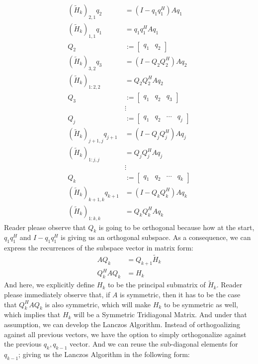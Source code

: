 \documentclass[]{article}
\theoremstyle{definition}
\begin{document}
        \begin{align}
            (\tilde{H}_k)_{2, 1}q_2 &= (I - q_1q_1^H)Aq_1
            \\
            (\tilde{H}_k)_{1, 1}q_1 &= q_1q_1^HAq_1
            \\
            Q_2 &:= \begin{bmatrix}
                q_1 & q_2
            \end{bmatrix}
            \\
            (\tilde{H}_k)_{3, 2}q_3 &= (I - Q_2Q_2^H)Aq_2
            \\
            (\tilde{H}_k)_{1:2, 2} &= Q_2Q_2^HAq_2
            \\
            Q_3 &:= \begin{bmatrix}
                q_1 & q_2 & q_3
            \end{bmatrix}
            \\
            & \vdots 
            \\
            Q_j &:= \begin{bmatrix}
                q_1 & q_2 & \cdots & q_j
            \end{bmatrix}
            \\
            (\tilde{H}_k)_{j + 1, j}q_{j + 1}&= (I - Q_jQ_j^H)Aq_j
            \\
            (\tilde{H}_k)_{1:j, j} &= Q_jQ_j^HAq_j
            \\
            &\vdots 
            \\
            Q_k &:= \begin{bmatrix}
                q_1 & q_2 & \cdots & q_k
            \end{bmatrix}
            \\
            (\tilde{H}_k)_{k + 1, k}q_{k + 1}&= (I - Q_kQ_k^H)Aq_k
            \\
            (\tilde{H}_k)_{1:k, k} &= Q_kQ_k^HAq_k
        \end{align}
        Reader please observe that $Q_k$ is going to be orthogonal because how at the start, $q_1q_1^H$ and $I - q_1q_1^H$ is giving us an orthogonal subspace. As a consequence, we can express the recurrences of the subspace vector in matrix form: 
        \begin{align}
            AQ_{k} &= Q_{k + 1}\tilde{H}_k
            \\
            Q_{k}^HAQ_{k} &= H_k
        \end{align}
        And here, we explicitly define $H_k$ to be the principal submatrix of $\tilde{H}_k$. Reader please immediately observe that, if $A$ is symmetric, then it has to be the case that $Q^H_kAQ_k$ is also symmetric, which will make $H_k$ to be symmetric as well, which implies that $H_k$ will be a Symmetric Tridiagonal Matrix. And under that assumption, we can develop the Lanczos Algorithm. Instead of orthogoalizing against all previous vectors, we have the option to simply orthogonalize against the previous $q_k, q_{k - 1}$ vector. And we can reuse the sub-diagonal elements for $q_{k - 1}$; giving us the Lanczos Algorithm in the following form: 
\end{document}
